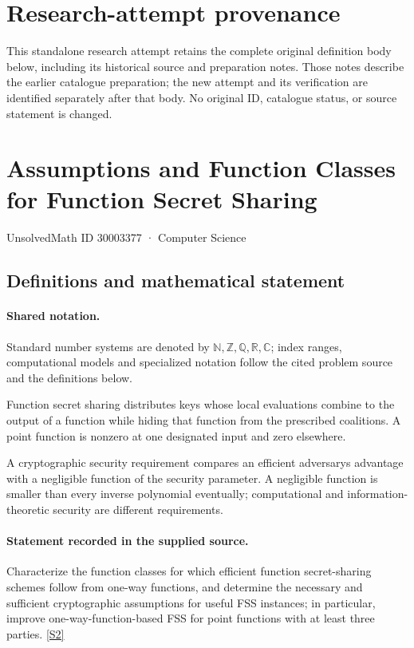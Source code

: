 \documentclass[11pt]{article}
\begin{document}
\section*{Research-attempt provenance}
This standalone research attempt retains the complete original definition body below,
including its historical source and preparation notes. Those notes describe the
earlier catalogue preparation; the new attempt and its verification are identified
separately after that body. No original ID, catalogue status, or source statement is changed.

\section{Assumptions and Function Classes for Function Secret Sharing}\label{30003377}
{\small UnsolvedMath ID 30003377 · Computer Science}
\subsection{Definitions and mathematical statement}

\paragraph{Shared notation.}Standard number systems are denoted by $\mathbb N,\mathbb Z,\mathbb Q,\mathbb R,\mathbb C$; index ranges, computational models and specialized notation follow the cited problem source and the definitions below.


Function secret sharing distributes keys whose local evaluations combine to the output of a function while hiding that function from the prescribed coalitions. A point function is nonzero at one designated input and zero elsewhere.

A cryptographic security requirement compares an efficient adversary\textquotesingle s advantage with a negligible function of the security parameter. A negligible function is smaller than every inverse polynomial eventually; computational and information-theoretic security are different requirements.
\paragraph{Statement recorded in the supplied source.}
Characterize the function classes for which efficient function secret-sharing schemes follow from one-way functions, and determine the necessary and sufficient cryptographic assumptions for useful FSS instances; in particular, improve one-way-function-based FSS for point functions with at least three parties. \href{https://doi.org/10.4171/owr/2017/5}{[S2]}
\end{document}

